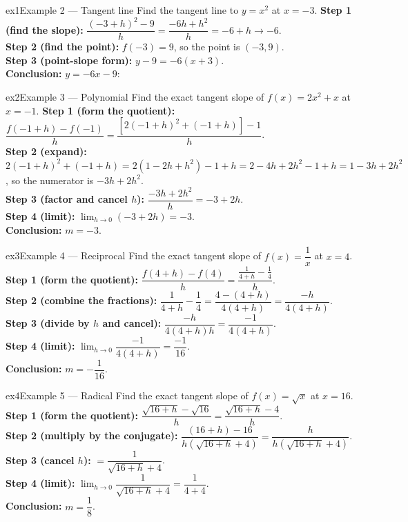 \documentclass[11pt]{article}
\begin{document}
\begin{example}{ex1}{Example 2 --- Tangent line}
Find the tangent line to $y=x^2$ at $x=-3$.\soln
\textbf{Step 1 (find the slope):} $\dfrac{(-3+h)^2-9}{h}=\dfrac{-6h+h^2}{h}=-6+h\to-6$.\\[3pt]
\textbf{Step 2 (find the point):} $f(-3)=9$, so the point is $(-3,9)$.\\[3pt]
\textbf{Step 3 (point-slope form):} $y-9=-6(x+3)$.\\[3pt]
\textbf{Conclusion:} $y=-6x-9$:
\end{example}

\begin{example}{ex2}{Example 3 --- Polynomial}
Find the exact tangent slope of $f(x)=2x^2+x$ at $x=-1$.\soln
\textbf{Step 1 (form the quotient):} $\dfrac{f(-1+h)-f(-1)}{h}=\dfrac{[2(-1+h)^2+(-1+h)]-1}{h}$.\\[3pt]
\textbf{Step 2 (expand):} $2(-1+h)^2+(-1+h)=2(1-2h+h^2)-1+h=2-4h+2h^2-1+h=1-3h+2h^2$, so the numerator is $-3h+2h^2$.\\[3pt]
\textbf{Step 3 (factor and cancel $h$):} $\dfrac{-3h+2h^2}{h}=-3+2h$.\\[3pt]
\textbf{Step 4 (limit):} $\lim_{h\to0}(-3+2h)=-3$.\\[3pt]
\textbf{Conclusion:} $m=-3$.
\end{example}

\begin{example}{ex3}{Example 4 --- Reciprocal}
Find the exact tangent slope of $f(x)=\dfrac1x$ at $x=4$.\soln
\textbf{Step 1 (form the quotient):} $\dfrac{f(4+h)-f(4)}{h}=\dfrac{\frac1{4+h}-\frac14}{h}$.\\[3pt]
\textbf{Step 2 (combine the fractions):} $\dfrac1{4+h}-\dfrac14=\dfrac{4-(4+h)}{4(4+h)}=\dfrac{-h}{4(4+h)}$.\\[3pt]
\textbf{Step 3 (divide by $h$ and cancel):} $\dfrac{-h}{4(4+h)h}=\dfrac{-1}{4(4+h)}$.\\[3pt]
\textbf{Step 4 (limit):} $\lim_{h\to0}\dfrac{-1}{4(4+h)}=\dfrac{-1}{16}$.\\[3pt]
\textbf{Conclusion:} $m=-\dfrac1{16}$.
\end{example}

\begin{example}{ex4}{Example 5 --- Radical}
Find the exact tangent slope of $f(x)=\sqrt{x}$ at $x=16$.\soln
\textbf{Step 1 (form the quotient):} $\dfrac{\sqrt{16+h}-\sqrt{16}}{h}=\dfrac{\sqrt{16+h}-4}{h}$.\\[3pt]
\textbf{Step 2 (multiply by the conjugate):} $\dfrac{(16+h)-16}{h(\sqrt{16+h}+4)}=\dfrac{h}{h(\sqrt{16+h}+4)}$.\\[3pt]
\textbf{Step 3 (cancel $h$):} $=\dfrac{1}{\sqrt{16+h}+4}$.\\[3pt]
\textbf{Step 4 (limit):} $\lim_{h\to0}\dfrac{1}{\sqrt{16+h}+4}=\dfrac{1}{4+4}$.\\[3pt]
\textbf{Conclusion:} $m=\dfrac18$.
\end{example}
\end{document}
